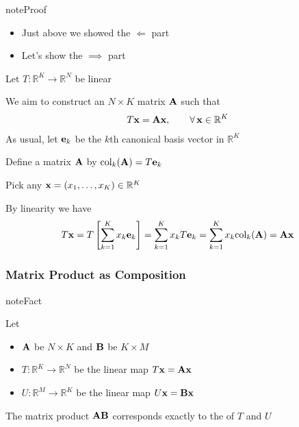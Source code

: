 \documentclass[letterpaper,10pt,english]{jupyterBook}
\begin{document}
\begin{sphinxadmonition}{note}{Proof}
\begin{itemize}
\item {} 
\sphinxAtStartPar
Just above we showed the \(\Longleftarrow\) part

\item {} 
\sphinxAtStartPar
Let’s show the \(\implies\) part

\end{itemize}

\sphinxAtStartPar
Let \(T \colon \mathbb{R}^K \to \mathbb{R}^N\) be linear

\sphinxAtStartPar
We aim to construct an \(N \times K\) matrix \({\bf A}\) such that
\begin{equation*}
\begin{split} T{\bf x} = {\bf A} {\bf x}, \qquad \forall \, {\bf x} \in \mathbb{R}^K \end{split}
\end{equation*}
\sphinxAtStartPar
As usual, let
\({\bf e}_k\) be the \(k\)\sphinxhyphen{}th canonical basis vector in \(\mathbb{R}^K\)

\sphinxAtStartPar
Define a matrix \({\bf A}\) by \(\mathrm{col}_k({\bf A}) = T{\bf e}_k\)

\sphinxAtStartPar
Pick any \({\bf x} = (x_1, \ldots, x_K) \in \mathbb{R}^K\)

\sphinxAtStartPar
By linearity we have
\begin{equation*}
\begin{split}
%
T{\bf x} 
= T \left[\sum_{k=1}^K x_k {\bf e}_k \right]
= \sum_{k=1}^K x_k T {\bf e}_k
= \sum_{k=1}^K x_k \mathrm{col}_k({\bf A})
= {\bf A} {\bf x}
%
\end{split}
\end{equation*}\end{sphinxadmonition}


\subsubsection{Matrix Product as Composition}
\label{\detokenize{05.linear_algebra:matrix-product-as-composition}}
\begin{sphinxadmonition}{note}{Fact}

\sphinxAtStartPar
Let
\begin{itemize}
\item {} 
\sphinxAtStartPar
\({\bf A}\) be \(N \times K\) and \({\bf B}\) be \(K \times M\)

\item {} 
\sphinxAtStartPar
\(T \colon \mathbb{R}^K \to \mathbb{R}^N\) be the linear map \(T{\bf x} = {\bf A}{\bf x}\)

\item {} 
\sphinxAtStartPar
\(U \colon \mathbb{R}^M \to \mathbb{R}^K\) be the linear map \(U{\bf x} = {\bf B}{\bf x}\)

\end{itemize}

\sphinxAtStartPar
The matrix product \({\bf A} {\bf B}\) corresponds exactly to the
 of \(T\) and \(U\)
\end{sphinxadmonition}
\end{document}

